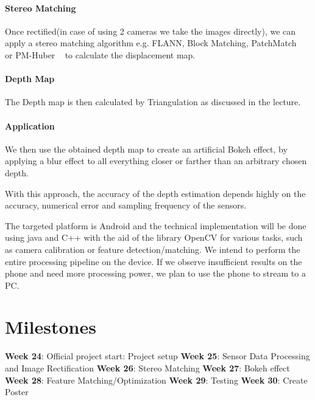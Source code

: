 \documentclass[a4paper,pagesize 10pt]{scrartcl}
\begin{document}
\paragraph{Stereo Matching}
Once rectified(in case of using 2 cameras we take the images directly), we can apply a stereo matching algorithm e.g. FLANN, Block Matching, PatchMatch ~\cite{Bleyer2011} or PM-Huber ~\cite{Heise2013} to calculate the displacement map. 
\paragraph{Depth Map}
The Depth map is then calculated by Triangulation as discussed in the lecture.
\paragraph{Application}
We then use the obtained depth map to create an artificial Bokeh effect, by applying a blur effect to all everything closer or farther than an arbitrary chosen depth.


With this approach, the accuracy of the depth estimation depends highly on the accuracy, numerical error and sampling frequency of the sensors.

The targeted platform is Android and the technical implementation will be done using java and C++ with the aid of the library OpenCV for various tasks, such as camera calibration or feature detection/matching. We intend to perform the entire processing pipeline on the device. If we observe insufficient results on the phone and need more processing power, we plan to use the phone to stream to a PC.

%
%
\section{Milestones}
\textbf{Week 24}: Official project start: Project setup\newline
\textbf{Week 25}: Sensor Data Processing and Image Rectification\newline
\textbf{Week 26}: Stereo Matching\newline
\textbf{Week 27}: Bokeh effect\newline
\textbf{Week 28}: Feature Matching/Optimization \newline
\textbf{Week 29}: Testing\newline
\textbf{Week 30}: Create Poster\newline
\end{document}
